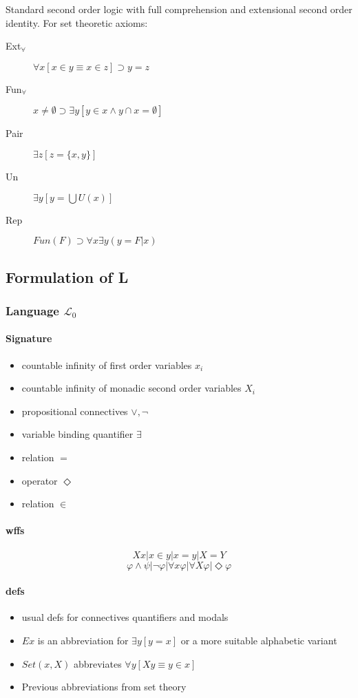 \documentclass{article}
\begin{document}
Standard second order logic with full comprehension and extensional second order 
identity. For set theoretic axioms:

\begin{description}
    \item[Ext$_\forall$] $\forall x[x \in y \equiv x \in z] \supset y = z$
    \item[Fun$_\forall$] $ x \not = \emptyset \supset \exists y[y \in x \wedge y \cap x = \emptyset]$
    \item[Pair] $\exists z[z = \{x, y\}]$
    \item[Un] $\exists y [y = \bigcup{U}(x)]$
    \item[Rep] $Fun (F) \supset \forall x\exists y(y = F|x)$
\end{description}



\subsection{Formulation of L}

\subsubsection{Language $\mathcal{L}_0$}
\paragraph{Signature}
\begin{itemize}
    \item countable infinity of first order variables $x_i$
    \item countable infinity of monadic second order variables $X_i$
    \item propositional connectives $\vee, \neg$
    \item variable binding quantifier $\exists$
    \item relation $=$
    \item operator $\Diamond$
    \item relation $\in$
\end{itemize}

\paragraph{wffs}
    $$Xx | x \in y | x = y | X = Y$$
    $$\varphi \wedge \psi | \neg \varphi | \forall x \varphi | \forall X \varphi | \Diamond \varphi$$

\paragraph{defs}
\begin{itemize}
    \item usual defs for connectives quantifiers and modals
    \item $Ex$ is an abbreviation for $\exists y[y = x]$ or a more suitable alphabetic variant
    \item $Set(x, X)$ abbreviates $\forall y[Xy \equiv y \in x]$
    \item Previous abbreviations from set theory
\end{itemize}
\end{document}
